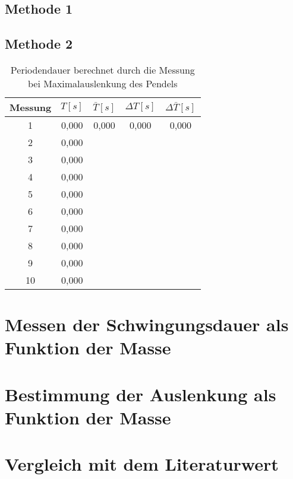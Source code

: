 \subsection*{Methode 1}
\messwertetabelle

\subsection*{Methode 2}
\begin{table}[h!]
    \centering
    \begin{tabular}{ccccc}\toprule
         Messung&  $T[s]$&  $\bar T[s]$& $\Delta T [s]$  & $\Delta \bar T [s]$\\\midrule
         1& 0,000 & 0,000 & 0,000 & 0,000\\
         2& 0,000 &  &  & \\
         3& 0,000 &  &  & \\
         4& 0,000 &  &  & \\
         5& 0,000 &  &  & \\
         6& 0,000 &  &  & \\
         7& 0,000 &  &  & \\
         8& 0,000 &  &  & \\
         9& 0,000 &  &  & \\
        10& 0,000 & & &\\ \bottomrule 
    \end{tabular}
    \caption{Periodendauer berechnet durch die Messung bei Maximalauslenkung des Pendels}
    \label{tab:periodendauer_Max}
\end{table}

\section{Messen der Schwingungsdauer als Funktion der Masse}
\section{Bestimmung der Auslenkung als Funktion der Masse}
\section{Vergleich mit dem Literaturwert}